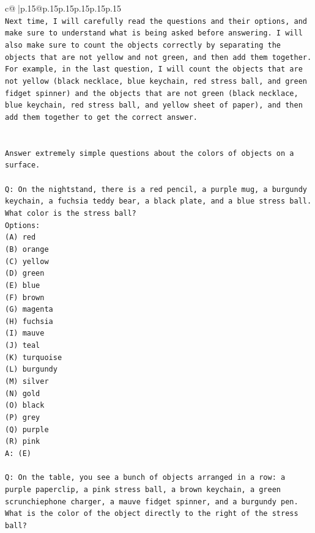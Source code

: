 \documentclass{article}
\begin{document}
{\begin{supertabular}{c@{$\;$}|p{.15\linewidth}@{}p{.15\linewidth}p{.15\linewidth}p{.15\linewidth}p{.15\linewidth}p{.15\linewidth}}
{{{\\ 
\texttt{Next time, I will carefully read the questions and their options, and make sure to understand what is being asked before answering. I will also make sure to count the objects correctly by separating the objects that are not yellow and not green, and then add them together. For example, in the last question, I will count the objects that are not yellow (black necklace, blue keychain, red stress ball, and green fidget spinner) and the objects that are not green (black necklace, blue keychain, red stress ball, and yellow sheet of paper), and then add them together to get the correct answer.} \\
\\ 
\\ 
\texttt{Answer extremely simple questions about the colors of objects on a surface.} \\
\\ 
\texttt{Q: On the nightstand, there is a red pencil, a purple mug, a burgundy keychain, a fuchsia teddy bear, a black plate, and a blue stress ball. What color is the stress ball?} \\
\texttt{Options:} \\
\texttt{(A) red} \\
\texttt{(B) orange} \\
\texttt{(C) yellow} \\
\texttt{(D) green} \\
\texttt{(E) blue} \\
\texttt{(F) brown} \\
\texttt{(G) magenta} \\
\texttt{(H) fuchsia} \\
\texttt{(I) mauve} \\
\texttt{(J) teal} \\
\texttt{(K) turquoise} \\
\texttt{(L) burgundy} \\
\texttt{(M) silver} \\
\texttt{(N) gold} \\
\texttt{(O) black} \\
\texttt{(P) grey} \\
\texttt{(Q) purple} \\
\texttt{(R) pink} \\
\texttt{A: (E)} \\
\\ 
\texttt{Q: On the table, you see a bunch of objects arranged in a row: a purple paperclip, a pink stress ball, a brown keychain, a green scrunchiephone charger, a mauve fidget spinner, and a burgundy pen. What is the color of the object directly to the right of the stress ball?} \\
}}}
\end{supertabular}}
\end{document}
